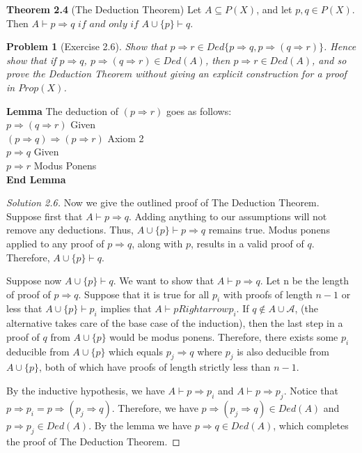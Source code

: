 \documentclass{article}
\theoremstyle{problemstyle}
\newtheorem{problem}{Problem}
\begin{document}
\begin{flushleft}
\textbf{Theorem 2.4} (The Deduction Theorem) Let $A \subseteq P(X)$, and let $p,q \in P(X)$. Then $A\vdash p\Rightarrow q$ $if$ $and$ $only$ $if$ $A \cup \{p\}\vdash q$.
\end{flushleft}

\begin{problem}[Exercise 2.6]
Show that $p \Rightarrow r \in Ded\{p\Rightarrow q, p \Rightarrow (q\Rightarrow r)\}$. Hence show that if $p \Rightarrow q$, $p \Rightarrow (q\Rightarrow r) \in Ded(A)$, then $p \Rightarrow r \in Ded(A)$, and so prove the Deduction Theorem without giving an explicit construction for a proof in $Prop(X)$. 
\end{problem}

\begin{flushleft}
\textbf{Lemma}
The deduction of $(p \Rightarrow r)$ goes as follows:\\
$p \Rightarrow (q \Rightarrow r)$                               Given\\
$(p \Rightarrow q) \Rightarrow (p \Rightarrow r)$             Axiom 2\\
$p \Rightarrow q$                                               Given\\
$p \Rightarrow r$                                        Modus Ponens\\
\textbf{End Lemma}
\end{flushleft}

\begin{proof}[Solution 2.6]
Now we give the outlined proof of The Deduction Theorem. Suppose first that $A \vdash p \Rightarrow q$. Adding anything to our assumptions will not remove any deductions. Thus, $A \cup \{p\} \vdash p \Rightarrow q$ remains true. Modus ponens applied to any proof of $p \Rightarrow q$, along with $p$, results in a valid proof of $q$. Therefore, $A \cup \{p\} \vdash q$. 

Suppose now $A \cup \{p\} \vdash q$. We want to show that $A \vdash p \Rightarrow q$. Let n be the length of proof of $p \Rightarrow q$. Suppose that it is true for all $p_i$ with proofs of length $n-1$ or less that $A \cup \{p\} \vdash p_i$ implies that $A \vdash p Rightarrow p_i$. If $q \notin A \cup \mathscr{A}$, (the alternative takes care of the base case of the induction), then the last step in a proof of $q$ from $A \cup \{p\}$ would be modus ponens. Therefore, there exists some $p_i$ deducible from $A \cup \{p\}$ which equals $p_j \Rightarrow q$ where $p_j$ is also deducible from $A \cup \{p\}$, both of which have proofs of length strictly less than $n-1$. 

By the inductive hypothesis, we have $A \vdash p \Rightarrow p_i$ and $A \vdash p \Rightarrow p_j$. Notice that $p \Rightarrow p_i = p \Rightarrow (p_j \Rightarrow q)$. Therefore, we have $p \Rightarrow (p_j \Rightarrow q) \in Ded(A)$ and $p \Rightarrow p_j \in Ded(A)$. By the lemma we have $p\Rightarrow q \in Ded(A)$, which completes the proof of The Deduction Theorem. 
\end{proof}
\end{document}
